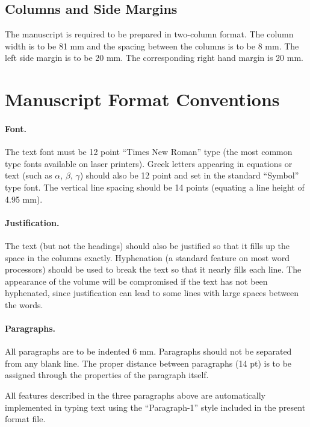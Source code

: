 \documentclass{stabs2021}
\begin{document}
\subsection{Columns and Side Margins}

The manuscript is required to be prepared in two-column format. The
column width is to be 81 mm and the spacing between the columns is to
be 8 mm. The left side margin is to be 20 mm. The corresponding right
hand margin is 20 mm.

\section{Manuscript Format Conventions}

\paragraph{Font.}

The text font must be 12 point ``Times New Roman'' type (the most
common type fonts available on laser printers). Greek letters
appearing in equations or text (such as \(\alpha\), \(\beta\),
\(\gamma\)) should also be 12 point and set in the standard ``Symbol''
type font. The vertical line spacing should be 14 points (equating a
line height of 4.95 mm).

\paragraph{Justification.}

The text (but not the headings) should also be justified so that it
fills up the space in the columns exactly. Hyphenation (a standard
feature on most word processors) should be used to break the text so
that it nearly fills each line. The appearance of the volume will be
compromised if the text has not been hyphenated, since justification
can lead to some lines with large spaces between the words.

\paragraph{Paragraphs.}

All paragraphs are to be indented 6 mm. Paragraphs should not be
separated from any blank line. The proper distance between paragraphs
(14 pt) is to be assigned through the properties of the paragraph
itself.

All features described in the three paragraphs above are
automatically implemented in typing text using the ``Paragraph-1''
style included in the present format file.
\end{document}
